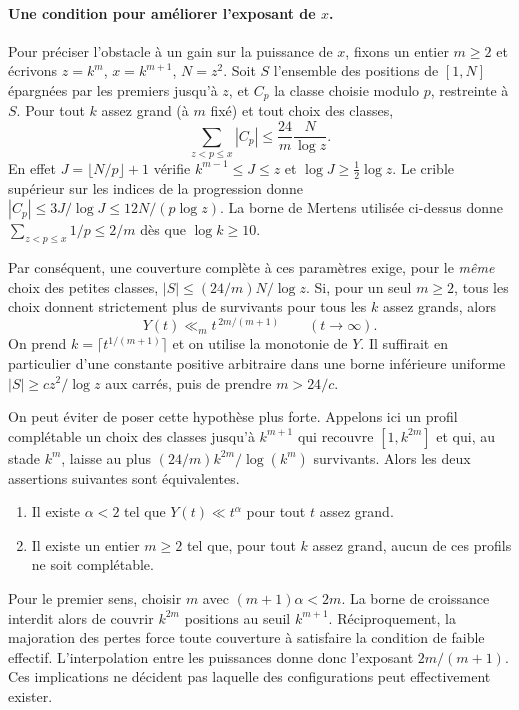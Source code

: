 \documentclass[11pt,a4paper]{article}
\begin{document}
\paragraph{Une condition pour améliorer l'exposant de $x$.}
Pour préciser l'obstacle à un gain sur la puissance de $x$, fixons un
entier $m\ge2$ et écrivons $z=k^m$, $x=k^{m+1}$, $N=z^2$. Soit $S$
l'ensemble des positions de $[1,N]$ épargnées par les premiers jusqu'à $z$,
et $C_p$ la classe choisie modulo $p$, restreinte à $S$. Pour tout $k$
assez grand (à $m$ fixé) et tout choix des classes,
\[
 \sum_{z<p\le x}|C_p|\le\frac{24}{m}\frac{N}{\log z}.
\]
En effet $J=\lfloor N/p\rfloor+1$ vérifie
$k^{m-1}\le J\le z$ et $\log J\ge\frac12\log z$.
Le crible supérieur sur les indices de la progression donne
$|C_p|\le3J/\log J\le12N/(p\log z)$. La borne de Mertens utilisée
ci-dessus donne $\sum_{z<p\le x}1/p\le2/m$ dès que $\log k\ge10$.

Par conséquent, une couverture complète à ces paramètres exige, pour
le \emph{même} choix des petites classes, $|S|\le(24/m)N/\log z$.
Si, pour un seul $m\ge2$, tous les choix donnent strictement plus de
survivants pour tous les $k$ assez grands, alors
\[
      Y(t)\ll_m t^{\,2m/(m+1)}\qquad(t\to\infty).
\]
On prend $k=\lceil t^{1/(m+1)}\rceil$ et on utilise la monotonie de
$Y$. Il suffirait en particulier d'une constante positive arbitraire
dans une borne inférieure uniforme $|S|\ge c z^2/\log z$ aux carrés,
puis de prendre $m>24/c$.

On peut éviter de poser cette hypothèse plus forte. Appelons ici un
profil complétable un choix des classes jusqu'à $k^{m+1}$ qui recouvre
$[1,k^{2m}]$ et qui, au stade $k^m$, laisse au plus
$(24/m)k^{2m}/\log(k^m)$ survivants. Alors les deux assertions suivantes
sont équivalentes.
\begin{enumerate}
\item Il existe $\alpha<2$ tel que $Y(t)\ll t^\alpha$ pour tout $t$
assez grand.
\item Il existe un entier $m\ge2$ tel que, pour tout $k$ assez grand,
aucun de ces profils ne soit complétable.
\end{enumerate}
Pour le premier sens, choisir $m$ avec $(m+1)\alpha<2m$. La borne de
croissance interdit alors de couvrir $k^{2m}$ positions au seuil
$k^{m+1}$. Réciproquement, la majoration des pertes force toute
couverture à satisfaire la condition de faible effectif. L'interpolation
entre les puissances donne donc l'exposant $2m/(m+1)$. Ces implications
ne décident pas laquelle des configurations peut effectivement exister.
\end{document}
